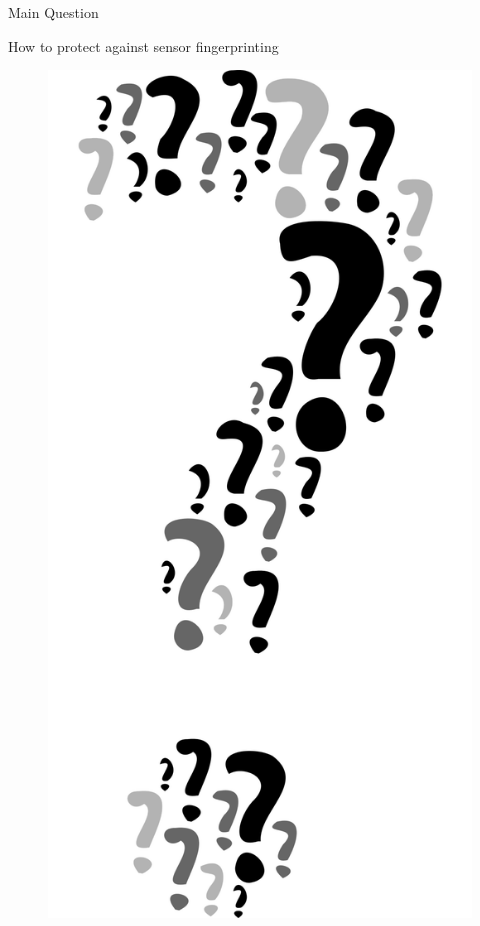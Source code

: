 \documentclass[aspectratio=169]{beamer}
[aspectratio=169] %
\begin{document}
\begin{frame}{Main Question}
  \begin{minipage}{0.65\textwidth} 
    How to protect against sensor fingerprinting
  \end{minipage}
  \hfill
  \begin{minipage}{0.34\textwidth} 
    \begin{figure}
      \centering
      \includegraphics[height=0.5\textheight]{figures/question.png}
    \end{figure}
  \end{minipage}
\end{frame}
\end{document}
